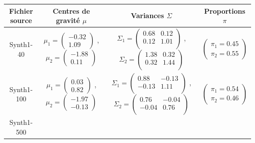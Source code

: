 \documentclass[a4paper,10pt]{report}
\begin{document}
\begin{table}[H]
	\centering
	\begin{tabular}{c|c|c|c}
		Fichier source & Centres de gravité $\mu$ & Variances $\Sigma$ & Proportions $\pi$ \\ 
		\hline
		\small Synth1-40 
		& 	$\mu_{1} = 
		\begin{pmatrix}
		-0.32 \\ 
		1.09
		\end{pmatrix} $ , 
		$\mu_{2} = 
		\begin{pmatrix}
		-1.88 \\ 
		0.11
		\end{pmatrix} $ 
		&  	$\Sigma_{1} = 
		\begin{pmatrix}
		0.68 & 0.12 \\
		0.12 & 1.01\\
		\end{pmatrix} $ , 
		$\Sigma_{2} = 
		\begin{pmatrix}
		1.38 & 0.32\\
		0.32 & 1.44 \\
		\end{pmatrix} $
		& 	$\begin{pmatrix} 
		\pi_{1} = 0.45\\
		\pi_{2} = 0.55
		\end{pmatrix}$\\ 
		\hline
		\small Synth1-100 
		& 	$\mu_{1} = 
		\begin{pmatrix}
		0.03 \\ 
		0.82
		\end{pmatrix} $ , 
		$\mu_{2} = 
		\begin{pmatrix}
		-1.97 \\ 
		-0.13
		\end{pmatrix} $ 
		&  	$\Sigma_{1} = 
		\begin{pmatrix}
		0.88 & -0.13\\
		-0.13 & 1.11\\
		\end{pmatrix} $ , 
		$\Sigma_{2} = 
		\begin{pmatrix}
		0.76 & -0.04\\
		-0.04 & 0.76\\
		\end{pmatrix} $
		& 	$\begin{pmatrix} 
		\pi_{1} = 0.54\\
		\pi_{2} = 0.46
		\end{pmatrix}$\\ 
		\hline
		\small Synth1-500 

\end{tabular}
\end{table}
\end{document}
